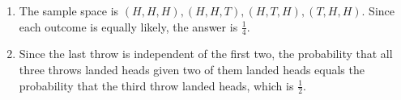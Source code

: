 \begin{enumerate}[label=(\alph*)]

\item The sample space is $(H, H, H), (H, H, T), (H, T, H), (T, H, H)$. Since each
outcome is equally likely, the answer is $\frac{1}{4}$.

\item Since the last throw is independent of the first two, the probability
that all three throws landed heads given two of them landed heads equals
the probability that the third throw landed heads, which is $\frac{1}{2}$.

\end{enumerate}